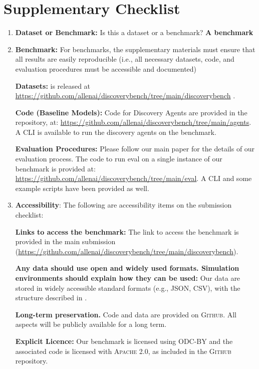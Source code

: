 \appendix

\section{Supplementary Checklist}
\begin{enumerate}
    \item \textbf{Dataset or Benchmark:} Is this a dataset or a benchmark? {\textbf{A benchmark}}
    
    \item \textbf{Benchmark:} For benchmarks, the supplementary materials must ensure that all results are easily reproducible (i.e., all necessary datasets, code, and evaluation procedures must be accessible and documented)
    
    \textbf{Datasets:} \discoverybench{} is released at \url{https://github.com/allenai/discoverybench/tree/main/discoverybench} . 

    \textbf{Code (Baseline Models):} Code for Discovery Agents are provided in the repository, at: \url{https://github.com/allenai/discoverybench/tree/main/agents}. A CLI is available to run the discovery agents on the benchmark. 

    \textbf{Evaluation Procedures:} Please follow our main paper for the details of our evaluation process. The code to run eval on a single instance of our benchmark is provided at: \url{https://github.com/allenai/discoverybench/tree/main/eval}. A CLI and some example scripts have been provided as well. 

    \item{\textbf{Accessibility}: The following are accessibility items on the submission checklist:}

    \textbf{Links to access the benchmark:} The link to access the benchmark is provided in the main submission (\url{https://github.com/allenai/discoverybench/tree/main/discoverybench}). 

    \textbf{Any data should use open and widely used formats. Simulation environments should explain how they can be used:} Our data are stored in widely accessible standard formats (e.g., \textsc{JSON, CSV}), with the structure described in  .  

    \textbf{Long-term preservation.} Code and data are provided on \textsc{Github}.  All aspects will be publicly available for a long term.

    \textbf{Explicit Licence:} Our benchmark is licensed using \textsc{ODC-BY} and the associated code is licensed with \textsc{Apache 2.0}, as included in the \textsc{Github} repository. 


\end{enumerate}
